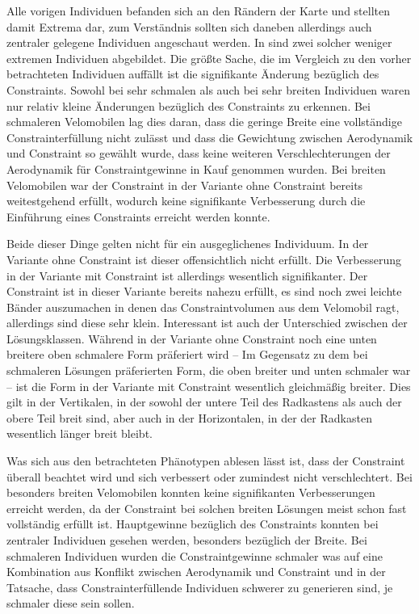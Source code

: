 Alle vorigen Individuen befanden sich an den Rändern der Karte und stellten damit Extrema dar, zum Verständnis sollten sich daneben allerdings auch zentraler gelegene Individuen angeschaut werden.
In  sind zwei solcher weniger extremen Individuen abgebildet.
Die größte Sache, die im Vergleich zu den vorher betrachteten Individuen auffällt ist die signifikante Änderung bezüglich des Constraints.
Sowohl bei sehr schmalen als auch bei sehr breiten Individuen waren nur relativ kleine Änderungen bezüglich des Constraints zu erkennen.
Bei schmaleren Velomobilen lag dies daran, dass die geringe Breite eine vollständige Constrainterfüllung nicht zulässt und dass die Gewichtung zwischen Aerodynamik und Constraint so gewählt wurde, dass keine weiteren Verschlechterungen der Aerodynamik für Constraintgewinne in Kauf genommen wurden.
Bei breiten Velomobilen war der Constraint in der Variante ohne Constraint bereits weitestgehend erfüllt, wodurch keine signifikante Verbesserung durch die Einführung eines Constraints erreicht werden konnte.

Beide dieser Dinge gelten nicht für ein ausgeglichenes Individuum.
In der Variante ohne Constraint ist dieser offensichtlich nicht erfüllt.
Die Verbesserung in der Variante mit Constraint ist allerdings wesentlich signifikanter.
Der Constraint ist in dieser Variante bereits nahezu erfüllt, es sind noch zwei leichte Bänder auszumachen in denen das Constraintvolumen aus dem Velomobil ragt, allerdings sind diese sehr klein.
Interessant ist auch der Unterschied zwischen der Lösungsklassen.
Während in der Variante ohne Constraint noch eine unten breitere oben schmalere Form präferiert wird -- Im Gegensatz zu dem bei schmaleren Lösungen präferierten Form, die oben breiter und unten schmaler war -- ist die Form in der Variante mit Constraint wesentlich gleichmäßig breiter.
Dies gilt in der Vertikalen, in der sowohl der untere Teil des Radkastens als auch der obere Teil breit sind, aber auch in der Horizontalen, in der der Radkasten wesentlich länger breit bleibt.

Was sich aus den betrachteten Phänotypen ablesen lässt ist, dass der Constraint überall beachtet wird und sich verbessert oder zumindest nicht verschlechtert.
Bei besonders breiten Velomobilen konnten keine signifikanten Verbesserungen erreicht werden, da der Constraint bei solchen breiten Lösungen meist schon fast vollständig erfüllt ist.
Hauptgewinne bezüglich des Constraints konnten bei zentraler Individuen gesehen werden, besonders bezüglich der Breite.
Bei schmaleren Individuen wurden die Constraintgewinne schmaler was auf eine Kombination aus Konflikt zwischen Aerodynamik und Constraint und in der Tatsache, dass Constrainterfüllende Individuen schwerer zu generieren sind, je schmaler diese sein sollen.



